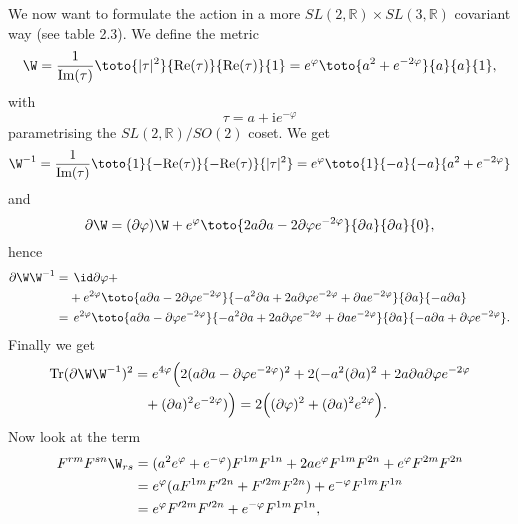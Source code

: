 We now want to formulate the action in a more $SL(2,{\mathbb R}) \times
SL(3,{\mathbb R})$ covariant way (see table 2.3). 
We define the metric
\begin{equation}
\W= {1 \over \mbox{Im} (\tau) }\toto{|\tau|^2 }{ \mbox{Re}(\tau) }{ \mbox{Re}(\tau) }{ 1} = e^{\varphi}\toto{a^2 + e^{-2\varphi} }{ a }{ a }{ 1},
\end{equation}
with
\begin{equation}
\tau = a + \mbox{i} e^{-\varphi}
\end{equation}
parametrising the $SL(2,{\mathbb R})/SO(2)$ coset. We get
\begin{equation}
\W^{-1}={1 \over \mbox{Im} (\tau) }\toto{ 1}{ -\mbox{Re}(\tau) }{ -\mbox{Re}(\tau) }{ |\tau|^2}=e^{\varphi}\toto{ 1}{ -a }{ -a }{ a^2 + e^{-2\varphi}}
\end{equation}
and
\begin{equation}
\partial \W=(\partial \varphi) \W + e^{\varphi}\toto{ 2a\partial a - 2\partial \varphi e^{-2\varphi}}{ \partial a }{ \partial a }{ 0},
\end{equation}
hence
\begin{align}
\partial \W \W^{-1}=& \hspace{0.15cm} \id \partial \varphi+ \nonumber \\
&  + e^{2\varphi}\toto{a\partial a - 2\partial \varphi e^{-2\varphi} }{ -a^2 \partial a + 2a\partial \varphi e^{-2\varphi} + \partial a e^{-2\varphi} }{ \partial a }{ -a \partial a} \nonumber \\
=& \hspace{0.15cm} e^{2\varphi}\toto{a\partial a - \partial \varphi e^{-2\varphi} }{ -a^2 \partial a + 2a\partial \varphi e^{-2\varphi} + \partial a e^{-2\varphi} }{ \partial a }{ -a \partial a + \partial \varphi e^{-2\varphi}}.
\end{align}
Finally we get
\begin{align}
\mbox{Tr}(\partial \W \W^{-1})^2 &= e^{4 \varphi}\Big{(}2(a\partial a - \partial \varphi e^{-2\varphi})^2 + 2(-a^2(\partial a)^2 + 2a\partial a\partial \varphi e^{-2 \varphi} \nonumber \\
&\phantom{=}+ (\partial a)^2 e^{-2 \varphi}) \Big{)}= 2\Big{(}(\partial \varphi)^2 + (\partial a)^2 e^{2 \varphi}\Big{)}.
\label{hej3}
\end{align}
Now look at the term
\begin{align}
F^{rm}F^{sn}\W_{rs} &= (a^2 e^{\varphi} + e^{-\varphi})F^{1m}F^{1n} + 2ae^{\varphi}F^{1m}F^{2n} +e^{\varphi}F^{2m}F^{2n} \nonumber \\
&= e^{\varphi}(aF^{1m}F'^{2n} + F'^{2m}F^{2n}) + e^{-\varphi}F^{1m}F^{1n} \nonumber \\
&= e^{\varphi}F'^{2m}F'^{2n} + e^{-\varphi} F^{1m}F^{1n},
\label{hej4}
\end{align}
